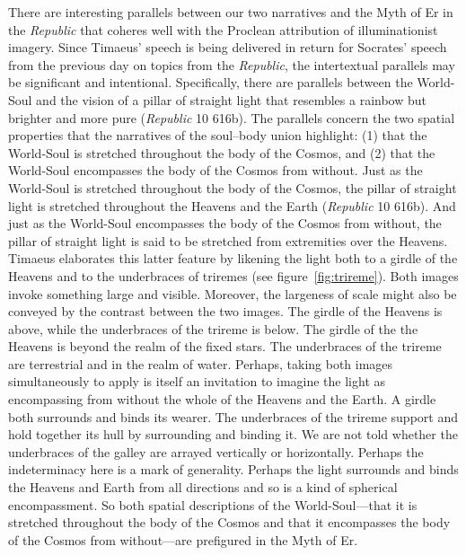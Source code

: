 There are interesting parallels between our two narratives and the Myth of Er in the \emph{Republic} that coheres well with the Proclean attribution of illuminationist imagery. Since Timaeus' speech is being delivered in return for Socrates' speech from the previous day on topics from the \emph{Republic}, the intertextual parallels may be significant and intentional. Specifically, there are parallels between the World-Soul and the vision of a pillar of straight light that resembles a rainbow but brighter and more pure (\emph{Republic} 10 616b). The parallels concern the two spatial properties that the narratives of the soul--body union highlight: (1) that the World-Soul is stretched throughout the body of the Cosmos, and (2) that the World-Soul encompasses the body of the Cosmos from without. Just as the World-Soul is stretched throughout the body of the Cosmos, the pillar of straight light is stretched throughout the Heavens and the Earth (\emph{Republic} 10 616b). And just as the World-Soul encompasses the body of the Cosmos from without, the pillar of straight light is said to be stretched from extremities over the Heavens. Timaeus elaborates this latter feature by likening the light both to a girdle of the Heavens and to the underbraces of triremes (see figure~\ref{fig:trireme}). Both images invoke something large and visible. Moreover, the largeness of scale might also be conveyed by the contrast between the two images. The girdle of the Heavens is above, while the underbraces of the trireme is below. The girdle of the the Heavens is beyond the realm of the fixed stars. The underbraces of the trireme are terrestrial and in the realm of water. Perhaps, taking both images simultaneously to apply is itself an invitation to imagine the light as encompassing from without the whole of the Heavens and the Earth. A girdle both surrounds and binds its wearer. The underbraces of the trireme support and hold together its hull by surrounding and binding it. We are not told whether the underbraces of the galley are arrayed vertically or horizontally. Perhaps the indeterminacy here is a mark of generality. Perhaps the light surrounds and binds the Heavens and Earth from all directions and so is a kind of spherical encompassment. So both spatial descriptions of the World-Soul---that it is stretched throughout the body of the Cosmos and that it encompasses the body of the Cosmos from without---are prefigured in the Myth of Er. 


